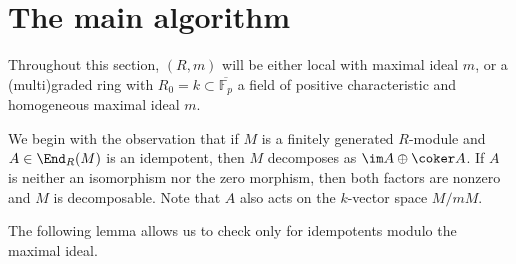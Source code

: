 \documentclass[12pt]{article}
\numberwithin{equation}{section}
\theoremstyle{theorem}
\numberwithin{thm}{section}
\theoremstyle{definition}
\begin{document}

\section{The main algorithm}\label{sec:main-alg}

Throughout this section, $(R,m)$ will be either local with maximal ideal $m$, or a (multi)graded ring with $R_0 = k \subset \overline{\mathbb F_p}$ a field of positive characteristic and homogeneous maximal ideal $m$.

We begin with the observation that if $M$ is a finitely generated $R$-module and $A\in\End_R(M)$ is an idempotent, then $M$ decomposes as $\im A \oplus \coker A$. If $A$ is neither an isomorphism nor the zero morphism, then both factors are nonzero and $M$ is decomposable. Note that $A$ also acts on the $k$-vector space $M/mM$.

The following lemma allows us to check only for idempotents modulo the maximal ideal.
\end{document}
